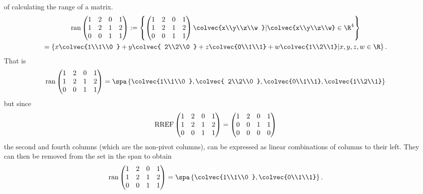 \begin{example}{ of calculating the range of a matrix.}
\begin{gather*}{\rm ran} 
\begin{pmatrix} 
1&2&0&1\\
1&2&1&2\\
0&0&1&1
\end{pmatrix} 
:= 
\left\{ 
\begin{pmatrix} 
1&2&0&1\\
1&2&1&2\\
0&0&1&1
\end{pmatrix} 
\colvec{x\\y\\z\\w } | \colvec{x\\y\\z\\w} \in \R^4 \right\}
\\=
\left\{   
x\colvec{1\\1\\0 } +y \colvec{ 2\\2\\0 } +z \colvec{0\\1\\1} + w\colvec{1\\2\\1} \middle| x,y,z,w \in \R \right\}
.\end{gather*}
That is 
\[
{\rm ran} 
\begin{pmatrix} 
1&2&0&1\\
1&2&1&2\\
0&0&1&1
\end{pmatrix} 
= 
\spa \left\{   
\colvec{1\\1\\0 } , \colvec{ 2\\2\\0 } , \colvec{0\\1\\1}, \colvec{1\\2\\1} \right\}
\]
but since 
\[{\rm RREF} \begin{pmatrix} 
1&2&0&1\\
1&2&1&2\\
0&0&1&1
\end{pmatrix} 
=\begin{pmatrix} 
1&2&0&1\\
0&0&1&1\\
0&0&0&0
\end{pmatrix} 
\]
the second and fourth columns (which are the non-pivot columns), can be expressed as linear combinations of columns to their left. 
They can then be removed from the set in the span to obtain
\[{\rm ran} 
\begin{pmatrix} 
1&2&0&1\\
1&2&1&2\\
0&0&1&1
\end{pmatrix} 
= \spa \left\{   
\colvec{1\\1\\0 } , \colvec{0\\1\\1} \right\} .
\]
\end{example}

